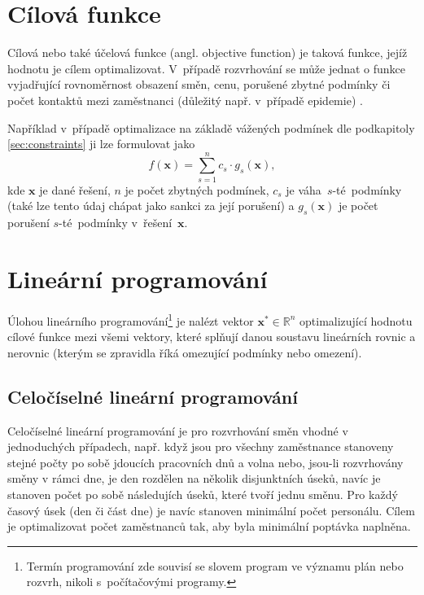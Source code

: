 \documentclass[twoside]{ctuthesis}
\begin{document}
\begin{table}
	
	\caption{}
	\label{}

\end{table}

\section{Cílová funkce}
\label{sec:objective}
Cílová nebo také účelová funkce (angl. objective function) je taková funkce, jejíž hodnotu je cílem optimalizovat. V~případě rozvrhování se může jednat o funkce vyjadřující rovnoměrnost obsazení směn, cenu, porušené zbytné podmínky \cite{blochliger2004modeling} či počet kontaktů mezi zaměstnanci (důležitý např. v~případě epidemie) \cite{zucchi2020personnel}.

Například v~případě optimalizace na základě vážených podmínek dle podkapitoly \ref{sec:constraints} ji lze formulovat jako
\begin{equation}
	f(\boldsymbol{x}) = \sum_{s = 1}^n c_s \cdot g_s(\boldsymbol{x}),
\end{equation}
kde $\boldsymbol{x}$ je dané řešení, $n$ je počet zbytných podmínek, $c_s$ je váha~$s$-té~podmínky (také lze tento údaj chápat jako sankci za její porušení) a $g_s(\boldsymbol{x})$ je počet porušení $s$-té~podmínky v~řešení~$\boldsymbol{x}$. \cite{awadallah2015hybrid}

\section{Lineární programování}
Úlohou lineárního programování\footnote{Termín programování zde souvisí se slovem program ve významu plán nebo rozvrh, nikoli s~počítačovými programy. } je nalézt vektor $\boldsymbol{x}^{\ast} \in \mathbb{R}^n$ optimalizující hodnotu cílové funkce mezi všemi vektory, které splňují danou soustavu lineárních rovnic a nerovnic (kterým se zpravidla říká omezující podmínky nebo omezení). \cite{matousek2006linearni}

\subsection{Celočíselné lineární programování}

Celočíselné lineární programování je pro rozvrhování směn vhodné v jednoduchých případech, např. když jsou pro všechny zaměstnance stanoveny stejné počty po sobě jdoucích pracovních dnů a volna nebo, jsou-li rozvrhovány směny v rámci dne, je den rozdělen na několik disjunktních úseků, navíc je stanoven počet po sobě následujích úseků, které tvoří jednu směnu. Pro každý časový úsek (den či část dne) je navíc stanoven minimální počet personálu. \cite{satheeshkumar2014linear} Cílem je optimalizovat počet zaměstnanců tak, aby byla minimální poptávka naplněna.
\end{document}

